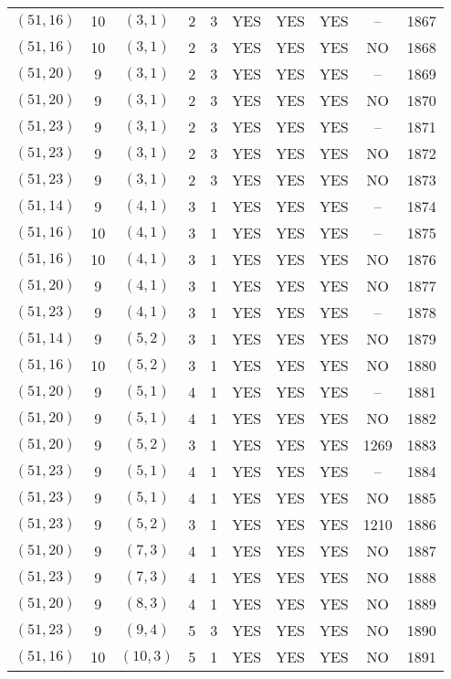 \begin{longtable}{|c|c|c|c|c|c|c|c|c|c|}
$(51, 16)$ & 10 & $(3, 1)$ & 2 & 3 & YES & YES & YES & -- & 1867\\
$(51, 16)$ & 10 & $(3, 1)$ & 2 & 3 & YES & YES & YES & NO & 1868\\
$(51, 20)$ & 9 & $(3, 1)$ & 2 & 3 & YES & YES & YES & -- & 1869\\
$(51, 20)$ & 9 & $(3, 1)$ & 2 & 3 & YES & YES & YES & NO & 1870\\
$(51, 23)$ & 9 & $(3, 1)$ & 2 & 3 & YES & YES & YES & -- & 1871\\
$(51, 23)$ & 9 & $(3, 1)$ & 2 & 3 & YES & YES & YES & NO & 1872\\
$(51, 23)$ & 9 & $(3, 1)$ & 2 & 3 & YES & YES & YES & NO & 1873\\
$(51, 14)$ & 9 & $(4, 1)$ & 3 & 1 & YES & YES & YES & -- & 1874\\
$(51, 16)$ & 10 & $(4, 1)$ & 3 & 1 & YES & YES & YES & -- & 1875\\
$(51, 16)$ & 10 & $(4, 1)$ & 3 & 1 & YES & YES & YES & NO & 1876\\
$(51, 20)$ & 9 & $(4, 1)$ & 3 & 1 & YES & YES & YES & NO & 1877\\
$(51, 23)$ & 9 & $(4, 1)$ & 3 & 1 & YES & YES & YES & -- & 1878\\
$(51, 14)$ & 9 & $(5, 2)$ & 3 & 1 & YES & YES & YES & NO & 1879\\
$(51, 16)$ & 10 & $(5, 2)$ & 3 & 1 & YES & YES & YES & NO & 1880\\
$(51, 20)$ & 9 & $(5, 1)$ & 4 & 1 & YES & YES & YES & -- & 1881\\
$(51, 20)$ & 9 & $(5, 1)$ & 4 & 1 & YES & YES & YES & NO & 1882\\
$(51, 20)$ & 9 & $(5, 2)$ & 3 & 1 & YES & YES & YES & 1269 & 1883\\
$(51, 23)$ & 9 & $(5, 1)$ & 4 & 1 & YES & YES & YES & -- & 1884\\
$(51, 23)$ & 9 & $(5, 1)$ & 4 & 1 & YES & YES & YES & NO & 1885\\
$(51, 23)$ & 9 & $(5, 2)$ & 3 & 1 & YES & YES & YES & 1210 & 1886\\
$(51, 20)$ & 9 & $(7, 3)$ & 4 & 1 & YES & YES & YES & NO & 1887\\
$(51, 23)$ & 9 & $(7, 3)$ & 4 & 1 & YES & YES & YES & NO & 1888\\
$(51, 20)$ & 9 & $(8, 3)$ & 4 & 1 & YES & YES & YES & NO & 1889\\
$(51, 23)$ & 9 & $(9, 4)$ & 5 & 3 & YES & YES & YES & NO & 1890\\
$(51, 16)$ & 10 & $(10, 3)$ & 5 & 1 & YES & YES & YES & NO & 1891\\

\end{longtable}
